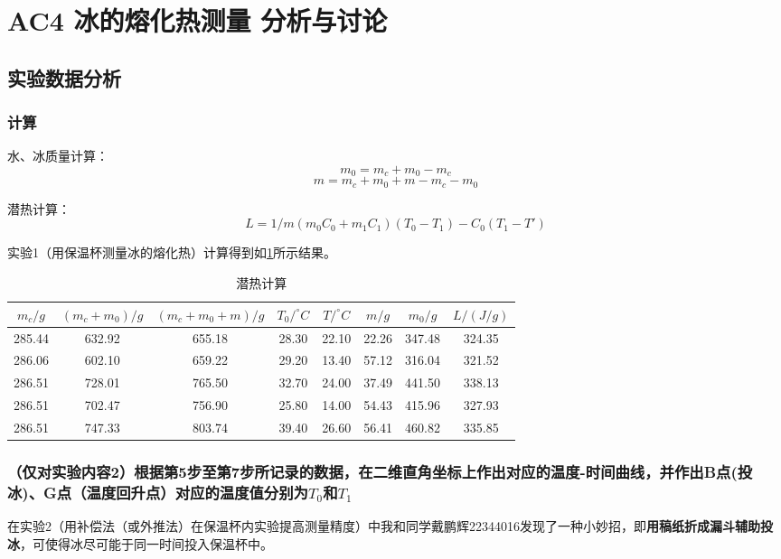 \documentclass[dvipsnames, svgnames,a4paper,11pt]{article}
\begin{document}
	\section{AC4 冰的熔化热测量 \quad\heiti 分析与讨论}
	\subsection{实验数据分析}
	
	\subsubsection{计算}
	水、冰质量计算：
	\[m_0=m_c+m_0-m_c\]
	\[m=m_c+m_0+m-m_c-m_0\]
	
	潜热计算：
	\[L=1/m (m_0 C_0+m_1 C_1 )(T_0-T_1 )-C_0(T_1-T')\]
	
	实验1（用保温杯测量冰的熔化热）计算得到如\cref{tab:tab5}所示结果。
	
	\begin{table}[h]
		\centering
		\begin{tabular}{|c|c|c|c|c|c|c|c|}
			\hline
			$m_c/g$ & $(m_c+m_0)/g$ & $(m_c+m_0+m)/g$ & $T_0/^\circ C$ & $T/^\circ C$ & $m/g$ & $m_0/g$ & $L/(J/g)$ \\
			\hline
			285.44 & 632.92 & 655.18 & 28.30 & 22.10 & 22.26 & 347.48 & 324.35 \\
			286.06 & 602.10 & 659.22 & 29.20 & 13.40 & 57.12 & 316.04 & 321.52 \\
			286.51 & 728.01 & 765.50 & 32.70 & 24.00 & 37.49 & 441.50 & 338.13 \\
			286.51 & 702.47 & 756.90 & 25.80 & 14.00 & 54.43 & 415.96 & 327.93 \\
			286.51 & 747.33 & 803.74 & 39.40 & 26.60 & 56.41 & 460.82 & 335.85 \\
			\hline
		\end{tabular}
		\caption{潜热计算}
		\label{tab:tab5}
	\end{table}	
	
	\clearpage
	\subsubsection{（仅对实验内容2）根据第5步至第7步所记录的数据，在二维直角坐标上作出对应的温度-时间曲线，并作出B点(投冰)、G点（温度回升点）对应的温度值分别为$T_0$和$T_1$}
	
	在实验2（用补偿法（或外推法）在保温杯内实验提高测量精度）中我和同学戴鹏辉22344016发现了一种小妙招，即\textbf{用稿纸折成漏斗辅助投冰}，可使得冰尽可能于同一时间投入保温杯中。
	
\end{document}
